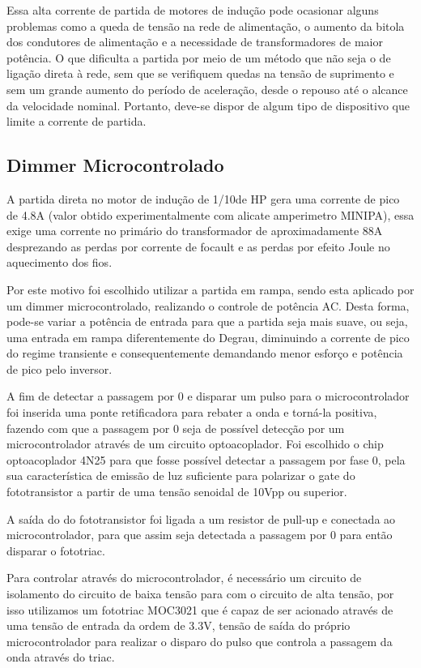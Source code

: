 Essa alta corrente de partida de motores de indução  pode ocasionar alguns problemas como a queda de tensão na rede de alimentação, o aumento da bitola dos condutores de alimentação e a necessidade de transformadores de maior potência. O que dificulta a partida por meio de um método que não seja o de ligação direta à rede, sem que se verifiquem quedas na tensão de suprimento e sem um grande aumento do período de aceleração, desde o repouso até o alcance da velocidade nominal. Portanto, deve-se dispor de algum tipo de dispositivo que limite a corrente de partida.

\subsection{Dimmer Microcontrolado}
 A partida direta no motor de indução de 1/10de HP gera uma corrente de pico de 4.8A (valor obtido experimentalmente com alicate amperimetro MINIPA), essa exige uma corrente no primário do transformador de aproximadamente 88A desprezando as perdas por corrente de focault e as perdas por efeito Joule no aquecimento dos fios.
 
 Por este motivo  foi escolhido utilizar a partida em rampa, sendo esta aplicado por um dimmer microcontrolado, realizando o controle de potência AC. Desta forma, pode-se variar a potência de entrada para que a partida seja mais suave, ou seja, uma entrada em rampa diferentemente do Degrau, diminuindo a corrente de pico do regime transiente e consequentemente demandando menor esforço e potência de pico pelo inversor.
 
 A fim de detectar a passagem por 0 e disparar um pulso para o microcontrolador foi inserida uma ponte retificadora para rebater a onda e torná-la positiva,  fazendo com que a passagem por 0 seja de possível detecção por um microcontrolador através de um circuito optoacoplador. Foi escolhido o chip optoacoplador 4N25 para que fosse possível detectar a passagem por fase 0, pela sua característica de emissão de luz suficiente para  polarizar o gate do fototransistor a partir de uma tensão senoidal de 10Vpp ou superior.
 
 A saída do do fototransistor foi ligada a um resistor de pull-up e conectada ao microcontrolador, para que assim seja detectada a passagem por 0 para então disparar o fototriac.
 
 Para controlar através do microcontrolador, é necessário um circuito de isolamento do circuito de baixa tensão para com o circuito de alta tensão, por isso utilizamos um fototriac MOC3021 que é capaz de ser acionado através de uma tensão de entrada da ordem de 3.3V, tensão de saída do próprio microcontrolador para realizar o disparo do pulso que controla a passagem da onda através do triac.
 
